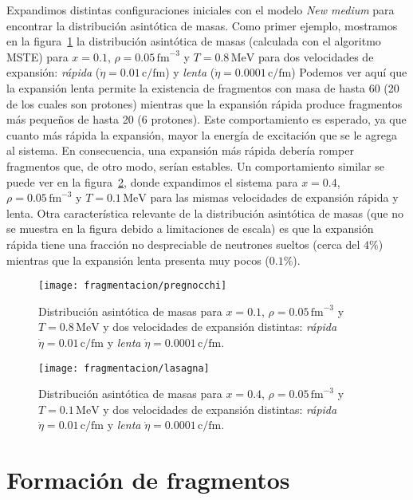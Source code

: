 Expandimos distintas configuraciones iniciales con el modelo \emph{New medium} para encontrar la distribución asintótica de masas.
Como primer ejemplo, mostramos en la figura~\ref{fig:asymp_preg} la distribución asintótica de masas (calculada con el algoritmo MSTE) para $x = 0.1$, $\rho = 0.05\,\text{fm}^{-3}$ y $T = 0.8\,\text{MeV}$ para dos velocidades de expansión: \emph{rápida} ($\dot{\eta} = 0.01\,\text{c/fm}$) y \emph{lenta} ($\dot{\eta} = 0.0001\,\text{c/fm}$)
Podemos ver aquí que la expansión lenta permite la existencia de fragmentos con masa de hasta 60 (20 de los cuales son protones) mientras que la expansión rápida produce fragmentos más pequeños de hasta 20 (6 protones).
Este comportamiento es esperado, ya que cuanto más rápida la expansión, mayor la energía de excitación que se le agrega al sistema.
En consecuencia, una expansión más rápida debería romper fragmentos que, de otro modo, serían estables.
Un comportamiento similar se puede ver en la figura~\ref{fig:asymp_las}, donde expandimos el sistema para $x = 0.4$, $\rho = 0.05\,\text{fm}^{-3}$ y $T = 0.1\,\text{MeV}$ para las mismas velocidades de expansión rápida y lenta.
Otra característica relevante de la distribución asintótica de masas (que no se muestra en la figura debido a limitaciones de escala) es que la expansión rápida tiene una fracción no despreciable de neutrones sueltos (cerca del $4\%$) mientras que la expansión lenta presenta muy pocos ($0.1\%$).

\begin{figure}[h]
  \centering
  \texttt{[image: fragmentacion/pregnocchi]}
  \caption{Distribución asintótica de masas para $x = 0.1$, $\rho = 0.05\,\text{fm}^{-3}$ y $T = 0.8\,\text{MeV}$ y dos velocidades de expansión distintas: \emph{rápida} $\dot{\eta} = 0.01\,\text{c/fm}$ y \emph{lenta} $\dot{\eta} = 0.0001\,\text{c/fm}$.}
\label{fig:asymp_preg}
\end{figure}

\begin{figure}[h]
  \centering
  \texttt{[image: fragmentacion/lasagna]}
  \caption{Distribución asintótica de masas para $x = 0.4$, $\rho = 0.05\,\text{fm}^{-3}$ y $T = 0.1\,\text{MeV}$ y dos velocidades de expansión distintas: \emph{rápida} $\dot{\eta} = 0.01\,\text{c/fm}$ y \emph{lenta} $\dot{\eta} = 0.0001\,\text{c/fm}$.}
\label{fig:asymp_las}
\end{figure}


\section{Formación de fragmentos}
\newcommand{\tabfig}[1]{\texttt{[image: fragmentacion/\#1]}}

